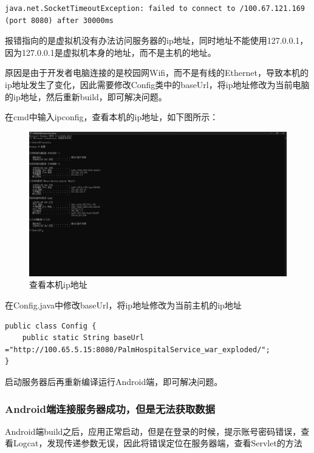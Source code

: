 \documentclass[UTF8,12pt]{article}
\begin{document}
\begin{lstlisting}[frame=shadowbox]
    java.net.SocketTimeoutException: failed to connect to /100.67.121.169 (port 8080) after 30000ms
\end{lstlisting}

报错指向的是虚拟机没有办法访问服务器的ip地址，同时地址不能使用127.0.0.1，因为127.0.0.1是虚拟机本身的地址，而不是主机的地址。

原因是由于开发者电脑连接的是校园网Wifi，而不是有线的Ethernet，导致本机的ip地址发生了变化，因此需要修改Config类中的baseUrl，将ip地址修改为当前电脑的ip地址，然后重新build，即可解决问题。

在cmd中输入ipconfig，查看本机的ip地址，如下图所示：

\newpage

\begin{figure}[htbp]
    \centering
    \includegraphics[width=1.0\textwidth]{imgs/28.png}
    \caption{查看本机ip地址}
\end{figure}

在Config.java中修改baseUrl，将ip地址修改为当前主机的ip地址

\begin{lstlisting}[frame=shadowbox]
public class Config {
    public static String baseUrl ="http://100.65.5.15:8080/PalmHospitalService_war_exploded/";
}
\end{lstlisting}

启动服务器后再重新编译运行Android端，即可解决问题。

\subsubsection{Android端连接服务器成功，但是无法获取数据}

Android端build之后，应用正常启动，但是在登录的时候，提示账号密码错误，查看Logcat，发现传递参数无误，因此将错误定位在服务器端，查看Servlet的方法
\end{document}
